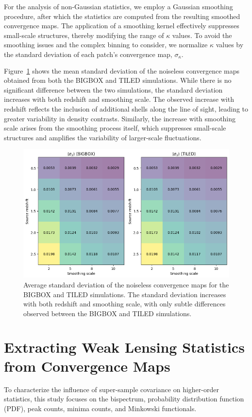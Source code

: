 For the analysis of non-Gaussian statistics, we employ a Gaussian smoothing procedure, after which the statistics are computed from the resulting smoothed convergence maps. The application of a smoothing kernel effectively suppresses small-scale structures, thereby modifying the range of $\kappa$ values. To avoid the smoothing issues and the complex binning to consider, we normalize $\kappa$ values by the standard deviation of each patch's convergence map, $\sigma_{\kappa}$. 

Figure~\ref{fig:avg_sigma0} shows the mean standard deviation of the noiseless convergence maps obtained from both the BIGBOX and TILED simulations. While there is no significant difference between the two simulations, the standard deviation increases with both redshift and smoothing scale. The observed increase with redshift reflects the inclusion of additional shells along the line of sight, leading to greater variability in density contrasts. Similarly, the increase with smoothing scale arises from the smoothing process itself, which suppresses small-scale structures and amplifies the variability of larger-scale fluctuations.

\begin{figure}[ht]
    \centering
    \includegraphics[width=\textwidth]{figures/avg_sigma0.png}
    \caption[Average standard deviation of noiseless convergence maps]{Average standard deviation of the noiseless convergence maps for the BIGBOX and TILED simulations. The standard deviation increases with both redshift and smoothing scale, with only subtle differences observed between the BIGBOX and TILED simulations.}
    \label{fig:avg_sigma0}
\end{figure}

\section{Extracting Weak Lensing Statistics from Convergence Maps}
To characterize the influence of super-sample covariance on higher-order statistics, this study focuses on the bispectrum, probability distribution function (PDF), peak counts, minima counts, and Minkowski functionals.

